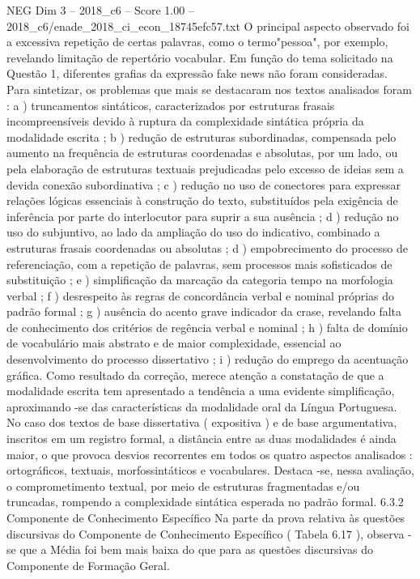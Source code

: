 \begin{textsample}{NEG Dim 3 – 2018\_c6 – Score 1.00 – 2018\_c6/enade\_2018\_ci\_econ\_18745efc57.txt}
O principal aspecto observado foi a excessiva repetição de certas palavras, como o termo"pessoa", por exemplo, revelando limitação de repertório vocabular.
Em função do tema solicitado na Questão 1, diferentes grafias da expressão fake news não foram consideradas.
Para sintetizar, os problemas que mais se destacaram nos textos analisados foram : a ) truncamentos sintáticos, caracterizados por estruturas frasais incompreensíveis devido à ruptura da complexidade sintática própria da modalidade escrita ; b ) redução de estruturas subordinadas, compensada pelo aumento na frequência de estruturas coordenadas e absolutas, por um lado, ou pela elaboração de estruturas textuais prejudicadas pelo excesso de ideias sem a devida conexão subordinativa ; c ) redução no uso de conectores para expressar relações lógicas essenciais à construção do texto, substituídos pela exigência de inferência por parte do interlocutor para suprir a sua ausência ; d ) redução no uso do subjuntivo, ao lado da ampliação do uso do indicativo, combinado a estruturas frasais coordenadas ou absolutas ; d ) empobrecimento do processo de referenciação, com a repetição de palavras, sem processos mais sofisticados de substituição ; e ) simplificação da marcação da categoria tempo na morfologia verbal ; f ) desrespeito às regras de concordância verbal e nominal próprias do padrão formal ; g ) ausência do acento grave indicador da crase, revelando falta de conhecimento dos critérios de regência verbal e nominal ; h ) falta de domínio de vocabulário mais abstrato e de maior complexidade, essencial ao desenvolvimento do processo dissertativo ; i ) redução do emprego da acentuação gráfica.
Como resultado da correção, merece atenção a constatação de que a modalidade escrita tem apresentado a tendência a uma evidente simplificação, aproximando -se das características da modalidade oral da Língua Portuguesa.
No caso dos textos de base dissertativa ( expositiva ) e de base argumentativa, inscritos em um registro formal, a distância entre as duas modalidades é ainda maior, o que provoca desvios recorrentes em todos os quatro aspectos analisados : ortográficos, textuais, morfossintáticos e vocabulares.
Destaca -se, nessa avaliação, o comprometimento textual, por meio de estruturas fragmentadas e/ou truncadas, rompendo a complexidade sintática esperada no padrão formal. 6.3.2 Componente de Conhecimento Específico Na parte da prova relativa às questões discursivas do Componente de Conhecimento Específico ( Tabela 6.17 ), observa -se que a Média foi bem mais baixa do que para as questões discursivas do Componente de Formação Geral.

\end{textsample}
